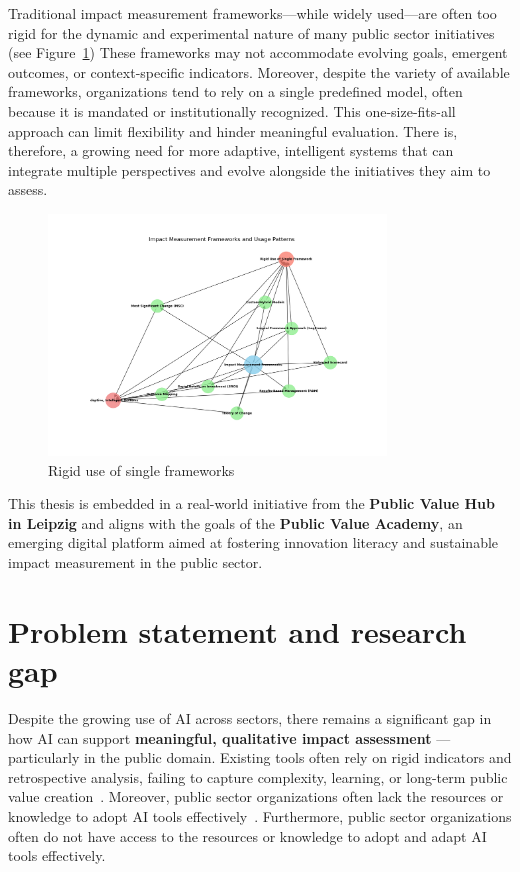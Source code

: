 Traditional impact measurement frameworks—while widely used—are often too rigid for the dynamic and experimental nature of many public sector initiatives (see Figure~\ref{fig:rigid_frameworks})
These frameworks may not accommodate evolving goals, emergent outcomes, or context-specific indicators.
Moreover, despite the variety of available frameworks, organizations tend to rely on a single predefined model, often because it is mandated or institutionally recognized.
This one-size-fits-all approach can limit flexibility and hinder meaningful evaluation.
There is, therefore, a growing need for more adaptive, intelligent systems that can integrate multiple perspectives and evolve alongside the initiatives they aim to assess.

\begin{figure}[H]
  \centering
  \includegraphics[width=0.8\textwidth]{../fig/rigid_use_frameworks}
  \caption{Rigid use of single frameworks}
  \label{fig:rigid_frameworks}
\end{figure}

This thesis is embedded in a real-world initiative from the \textbf{Public Value Hub in Leipzig} and aligns with the goals of the \textbf{Public Value Academy}, an emerging digital platform aimed at fostering innovation literacy and sustainable impact measurement in the public sector.

\section{Problem statement and research gap}\label{sec:problem-statement}
Despite the growing use of AI across sectors, there remains a significant gap in how AI can support \textbf{meaningful, qualitative impact assessment} — particularly in the public domain.
Existing tools often rely on rigid indicators and retrospective analysis, failing to capture complexity, learning, or long-term public value creation~\parencite{ebrahim2014impact, patton2011developmental}.
Moreover, public sector organizations often lack the resources or knowledge to adopt AI tools effectively~\parencite{mikhaylov2018ai}.
Furthermore, public sector organizations often do not have access to the resources or knowledge to adopt and adapt AI tools effectively.

